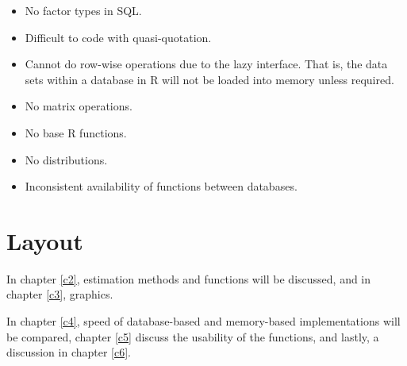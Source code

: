 \begin{itemize}
    \item No factor types in {\sf SQL}.
    \item Difficult to code with quasi-quotation.
    \item Cannot do row-wise operations due to the lazy interface. That is, the data sets within a database in {\sf R} will not be loaded into memory unless required.
    \item No matrix operations.
    \item No base {\sf R} functions. 
    \item No distributions.
    \item Inconsistent availability of functions between databases.
\end{itemize}


\section{Layout}

In chapter \ref{c2}, estimation methods and functions will be discussed, and in chapter \ref{c3}, graphics. 

In chapter \ref{c4}, speed of database-based and memory-based implementations will be compared,  chapter \ref{c5} discuss the usability of the functions, and lastly, a discussion in chapter \ref{c6}.